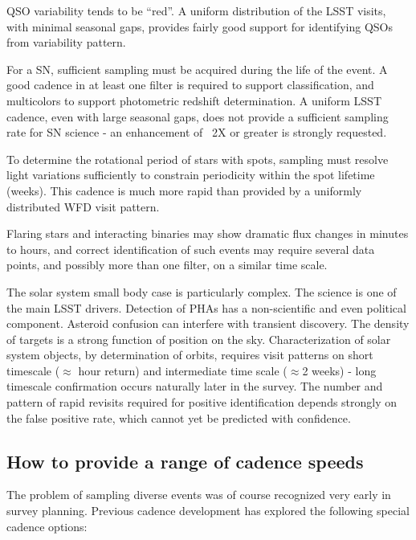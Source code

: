 QSO variability tends to be ``red''.   A uniform distribution of the LSST visits, with minimal seasonal gaps, provides fairly good support for identifying QSOs from variability pattern.
	
For a SN, sufficient sampling must be acquired during the life of the event. A good cadence in at least one filter is required to support classification, and multicolors to support photometric redshift determination.  A uniform LSST  cadence, even with large seasonal gaps, does not provide a sufficient sampling rate for SN science - an enhancement of ~2X or greater is strongly requested.
	
To determine the rotational period of stars with spots, sampling must resolve light variations sufficiently to constrain periodicity within the spot lifetime (weeks). This cadence is much more rapid than provided by a uniformly distributed WFD visit pattern.
	
Flaring stars and interacting binaries  may show dramatic flux changes in minutes to hours, and correct identification of such events may require several data points, and possibly more than one filter, on a similar time scale.
	
The solar system small body case is particularly complex.  The science is one of the main LSST drivers.  Detection of PHAs has a non-scientific and even political component. Asteroid confusion can interfere with transient discovery. The density of targets is a strong function of position on the sky.  Characterization of solar system objects, by determination of orbits, requires visit patterns on short timescale ($\approx$ hour return) and intermediate time scale ($\approx$2 weeks) - long timescale confirmation occurs naturally later in the survey.  The number and pattern of rapid revisits required for positive identification depends strongly on the false positive rate, which cannot yet be predicted with confidence. 

\subsection{How to provide a range of cadence speeds}

The problem of sampling diverse events was of course recognized very early in survey planning. Previous cadence development has explored the following special cadence options:


